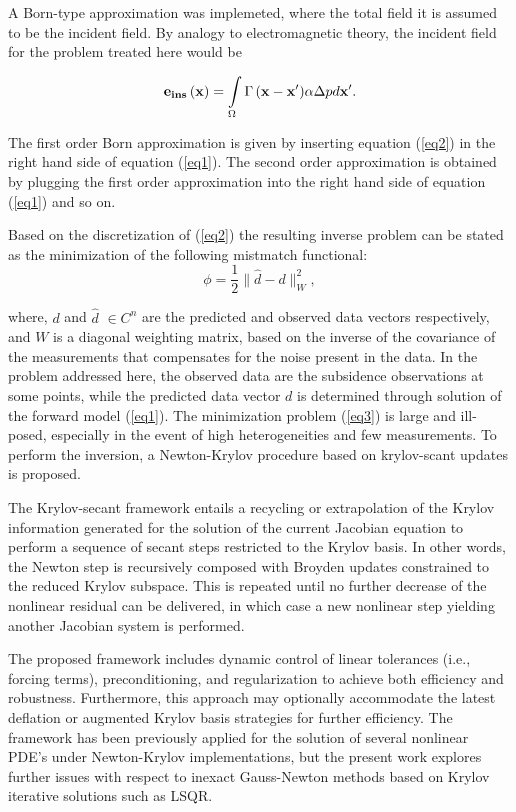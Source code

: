 \documentclass{report}
\begin{document}
A Born-type approximation was implemeted, where the total field it is
assumed to be the incident field. By analogy to electromagnetic
theory, the incident field for the problem treated here would be

\begin{equation}
{\bf{e_{ins}}}\left( {\bf{x}} \right) = \int\limits_\Omega
{\Gamma \left( {{\bf{x - x'}}} \right)} {\bf{\alpha }}\Delta
pd{\bf{x'}}. \label{eq2}
\end{equation}

The first order Born approximation is given by inserting equation
(\ref{eq2}) in the right hand side of equation (\ref{eq1}). The
second order approximation is obtained by plugging the first order
approximation into the right hand side of equation (\ref{eq1}) and
so on.

Based on the discretization of (\ref{eq2}) the resulting inverse
problem can be stated as the minimization of the following
mistmatch functional:
\begin{equation}
\phi =\frac{1}{2} \|\hat{d}-d\|_W^2, \label{eq3}
\end{equation}

where, $d$ and $\hat{d}$ $\in C^n$ are the predicted and observed
data vectors respectively, and $W$ is a diagonal weighting matrix,
based on the inverse of the covariance of the measurements that
compensates for the noise present in the data. In the problem
addressed here, the observed data are the subsidence observations
at some points, while the predicted data vector $d$ is determined
through solution of the forward model (\ref{eq1}). The
minimization problem (\ref{eq3}) is large and ill-posed,
especially in the event of high heterogeneities and few
measurements. To perform the inversion, a Newton-Krylov procedure
based on krylov-scant updates is proposed.

The Krylov-secant framework entails a recycling or extrapolation
of the Krylov information generated for the solution of the
current Jacobian equation to perform a sequence of secant steps
restricted to the Krylov basis. In other words, the Newton step is
recursively composed with Broyden updates constrained to the
reduced Krylov subspace. This is repeated until no further
decrease of the nonlinear residual can be delivered, in which case
a new nonlinear step yielding another Jacobian system is
performed.

The proposed framework includes dynamic control of linear
tolerances (i.e., forcing terms), preconditioning, and
regularization to achieve both efficiency and robustness.
Furthermore, this approach may optionally accommodate the latest
deflation or augmented Krylov basis strategies for further
efficiency. The framework has been previously applied for the
solution of several nonlinear PDE's under Newton-Krylov
implementations, but the present work explores further issues with
respect to inexact Gauss-Newton methods based on Krylov iterative
solutions such as LSQR.
\end{document}
